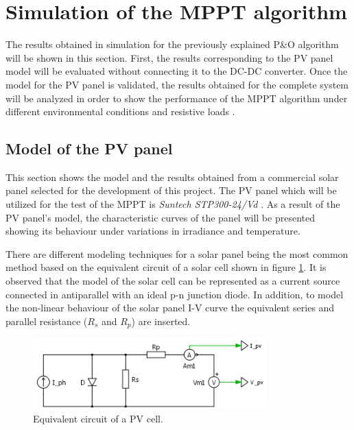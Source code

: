 
\section{Simulation of the MPPT algorithm} \label{MPPTSimulation}

The results obtained in simulation for the previously explained P\&O algorithm will be shown in this section. First, the results corresponding to the PV panel model will be evaluated without connecting it to the DC-DC converter. Once the model for the PV panel is validated, the results obtained for the complete system will be analyzed in order to show the performance of the MPPT algorithm under different environmental conditions and resistive loads .  

\subsection{Model of the PV panel}

This section shows the model and the results obtained from a commercial solar panel selected for the development of this project. The PV panel which will be utilized for the test of the MPPT is \textit{Suntech STP300-24/Vd} . As a result of the PV panel's model, the characteristic curves of the panel will be presented showing its behaviour under variations in irradiance and temperature.

There are different modeling techniques for a solar panel being the most common method based on the equivalent circuit of a solar cell shown in figure \ref{fig:eq_circuit_PVcell}. It is observed that the model of the solar cell can be represented as a current source connected in antiparallel with an ideal p-n junction diode. In addition, to model the non-linear behaviour of the solar panel I-V curve the equivalent series and parallel resistance ($R_{s}$ and $R_{p}$) are inserted.


\begin{figure}[H]
	\begin{center}
		\includegraphics[width=0.8\textwidth]{../Pictures/schematic_pv_cell}
		\caption{Equivalent circuit of a PV cell.}
		\label{fig:eq_circuit_PVcell} 
	\end{center}	
\end{figure}

